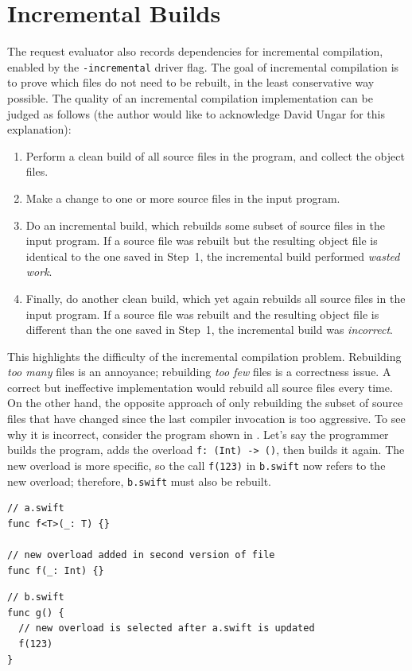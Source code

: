 \documentclass[../generics]{subfiles}
\begin{document}
\section{Incremental Builds}\label{incremental builds}
The request evaluator also records dependencies for incremental compilation, enabled by the \verb|-incremental| driver flag. The goal of incremental compilation is to prove which files do not need to be rebuilt, in the least conservative way possible. The quality of an incremental compilation implementation can be judged as follows (the author would like to acknowledge David Ungar for this explanation):
\begin{enumerate}
\item Perform a clean build of all source files in the program, and collect the object files.
\item Make a change to one or more source files in the input program.
\item Do an incremental build, which rebuilds some subset of source files in the input program. If a source file was rebuilt but the resulting object file is identical to the one saved in Step~1, the incremental build performed \emph{wasted work}.
\item Finally, do another clean build, which yet again rebuilds all source files in the input program. If a source file was rebuilt and the resulting object file is different than the one saved in Step~1, the incremental build was \emph{incorrect}.
\end{enumerate}
This highlights the difficulty of the incremental compilation problem. Rebuilding \emph{too many} files is an annoyance; rebuilding \emph{too few} files is a correctness issue. A correct but ineffective implementation would rebuild all source files every time. On the other hand, the opposite approach of only rebuilding the subset of source files that have changed since the last compiler invocation is too aggressive. To see why it is incorrect, consider the program shown in . Let's say the programmer builds the program, adds the overload \verb|f: (Int) -> ()|, then builds it again. The new overload is more specific, so the call \texttt{f(123)} in \texttt{b.swift} now refers to the new overload; therefore, \texttt{b.swift} must also be rebuilt.
\begin{listing}\label{incrlisting1}
\begin{Verbatim}
// a.swift
func f<T>(_: T) {}

// new overload added in second version of file
func f(_: Int) {}
\end{Verbatim}
\begin{Verbatim}
// b.swift
func g() {
  // new overload is selected after a.swift is updated
  f(123)
}
\end{Verbatim}
\end{listing}
\end{document}
